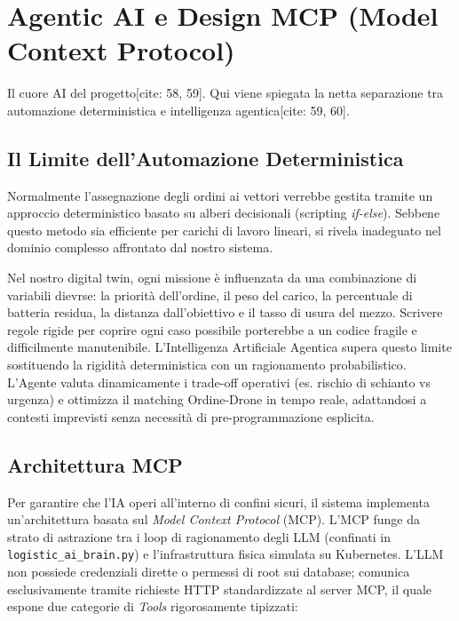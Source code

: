 
\chapter{Agentic AI e Design MCP (Model Context Protocol)}
\label{cap:agentic_operations_mcp}

Il cuore AI del progetto[cite: 58, 59]. Qui viene spiegata la netta separazione tra automazione deterministica e intelligenza agentica[cite: 59, 60].

\section{Il Limite dell'Automazione Deterministica}
\label{sec:limite_automazione}

Normalmente l'assegnazione degli ordini ai vettori verrebbe gestita tramite un approccio deterministico basato su alberi decisionali (scripting \textit{if-else}). Sebbene questo metodo sia efficiente per carichi di lavoro lineari, si rivela inadeguato nel dominio complesso affrontato dal nostro sistema. 

Nel nostro digital twin, ogni missione è influenzata da una combinazione di variabili dievrse: la priorità dell'ordine, il peso del carico, la percentuale di batteria residua, la distanza dall'obiettivo e il tasso di usura del mezzo. Scrivere regole rigide per coprire ogni caso possibile porterebbe a un codice fragile e difficilmente manutenibile. 
L'Intelligenza Artificiale Agentica supera questo limite sostituendo la rigidità deterministica con un ragionamento probabilistico. L'Agente valuta dinamicamente i trade-off operativi (es. rischio di schianto vs urgenza) e ottimizza il matching Ordine-Drone in tempo reale, adattandosi a contesti imprevisti senza necessità di pre-programmazione esplicita.

\section{Architettura MCP}
\label{sec:architettura_mcp}
Per garantire che l'IA operi all'interno di confini sicuri, il sistema implementa un'architettura basata sul \textit{Model Context Protocol} (MCP). L'MCP funge da strato di astrazione tra i loop di ragionamento degli LLM (confinati in \texttt{logistic\_ai\_brain.py}) e l'infrastruttura fisica simulata su Kubernetes. 
L'LLM non possiede credenziali dirette o permessi di root sui database; comunica esclusivamente tramite richieste HTTP standardizzate al server MCP, il quale espone due categorie di \textit{Tools} rigorosamente tipizzati:

